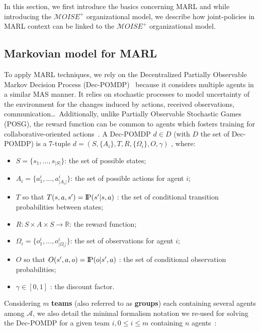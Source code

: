 \documentclass[sn-mathphys-num]{sn-jnl}%
\newcommand{\probP}{\text{I\kern-0.15em P}}
\theoremstyle{thmstyleone}%
\theoremstyle{thmstyletwo}%
\theoremstyle{thmstylethree}%
\begin{document}
In this section, we first introduce the basics concerning MARL and while introducing the $\mathcal{M}OISE^{+}$ organizational model, we describe how joint-policies in MARL context can be linked to the $\mathcal{M}OISE^{+}$ organizational model.

\subsection{Markovian model for MARL}

To apply MARL techniques, we rely on the Decentralized Partially Observable Markov Decision Process (Dec-POMDP)~\cite{Oliehoek2016} because it considers multiple agents in a similar MAS manner. It relies on stochastic processes to model uncertainty of the environment for the changes induced by actions, received observations, communication\dots \ Additionally, unlike Partially Observable Stochastic Games (POSG), the reward function can be common to agents which fosters training for collaborative-oriented actions~\cite{Beynier2013}.
A Dec-POMDP $d \in D$ (with $D$ the set of Dec-POMDP) is a 7-tuple $d = (S,\{A_i\},T,R,\{\Omega_i\},O,\gamma)$ , where:
\begin{itemize}
    \item $S = \{s_1,...,s_{|S|}\}$: the set of possible states;
    \item $A_{i} = \{a_{1}^{i},...,a_{|A_{i}|}^{i}\}$: the set of possible actions for agent $i$;
    \item $T$ so that $T(s,a,s') = \probP{(s'|s,a)}$ : the set of conditional transition probabilities between states;
    \item $R: S \times A \times S \rightarrow \mathbb{R}$: the reward function;
    \item $\Omega_{i} = \{o_{1}^{i},...,o_{|\Omega_{i}|}^{i}\}$: the set of observations for agent $i$;
    \item $O$ so that $O(s',a,o) = \probP{(o|s',a)}$ : the set of conditional observation probabilities;
    \item $\gamma \in [0,1]$ : the discount factor.
\end{itemize}

Considering $m$ \textbf{teams} (also referred to as \textbf{groups}) each containing several agents among $\mathcal{A}$, we also detail the minimal formalism notation we re-used for solving the Dec-POMDP for a given team $i, 0 \leq i \leq m$ containing $n$ agents~\cite{Beynier2013,Albrecht2024}:
\end{document}
